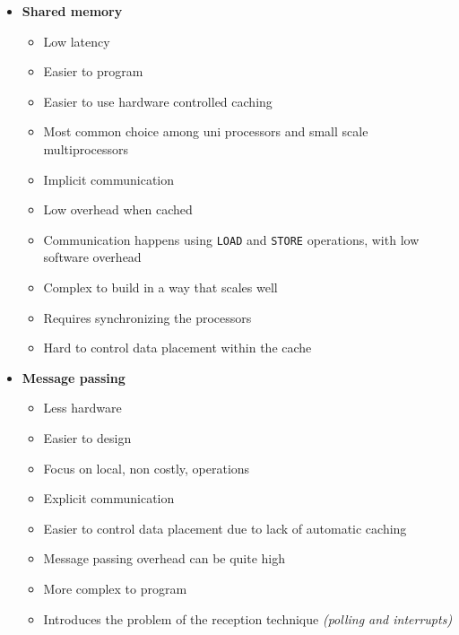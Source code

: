 \documentclass[english]{article}
\begin{document}
\begin{minipage}{0.99\textwidth}
  \bigskip
  \begin{itemize}
    \item \textbf{Shared memory}
          \begin{itemize}[label=\cmark]
            \item Low latency
            \item Easier to program
            \item Easier to use hardware controlled caching
            \item Most common choice among uni processors and small scale multiprocessors
            \item Implicit communication
            \item Low overhead when cached
            \item Communication happens using \texttt{LOAD} and \texttt{STORE} operations, with low software overhead
          \end{itemize}
          \begin{itemize}[label=\xmark]
            \item Complex to build in a way that scales well
            \item Requires synchronizing the processors
            \item Hard to control data placement within the cache
          \end{itemize}
    \item \textbf{Message passing}
          \begin{itemize}[label=\cmark]
            \item Less hardware
            \item Easier to design
            \item Focus on local, non costly, operations
            \item Explicit communication
            \item Easier to control data placement due to lack of automatic caching
          \end{itemize}
          \begin{itemize}[label=\xmark]
            \item Message passing overhead can be quite high
            \item More complex to program
            \item Introduces the problem of the reception technique \textit{(polling and interrupts)}
          \end{itemize}
  \end{itemize}
  \bigskip
\end{minipage}
\end{document}
